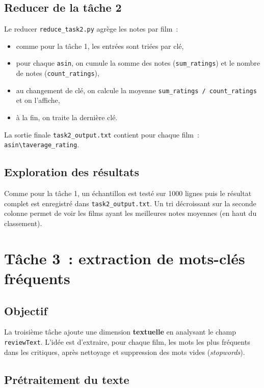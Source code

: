 \documentclass[a4paper,11pt]{article}
\begin{document}
\subsection{Reducer de la tâche 2}

Le reducer \texttt{reduce\_task2.py} agrège les notes par film~:
\begin{itemize}
  \item comme pour la tâche 1, les entrées sont triées par clé,\
  \item pour chaque \texttt{asin}, on cumule la somme des notes
        (\texttt{sum\_ratings}) et le nombre de notes
        (\texttt{count\_ratings}),\
  \item au changement de clé, on calcule la moyenne
        \texttt{sum\_ratings / count\_ratings} et on l'affiche,\
  \item à la fin, on traite la dernière clé.
\end{itemize}

La sortie finale \texttt{task2\_output.txt} contient pour chaque
film~:\\
\texttt{asin\textbackslash taverage\_rating}.

\subsection{Exploration des résultats}

Comme pour la tâche 1, un échantillon est testé sur 1000 lignes
puis le résultat complet est enregistré dans \texttt{task2\_output.txt}.
Un tri décroissant sur la seconde colonne permet de voir les films
ayant les meilleures notes moyennes (en haut du classement).

\section{Tâche 3~: extraction de mots-clés fréquents}

\subsection{Objectif}

La troisième tâche ajoute une dimension \textbf{textuelle} en
analysant le champ \texttt{reviewText}. L'idée est d'extraire,
pour chaque film, les mots les plus fréquents dans les critiques,
après nettoyage et suppression des mots vides (\emph{stopwords}).

\subsection{Prétraitement du texte}
\end{document}
